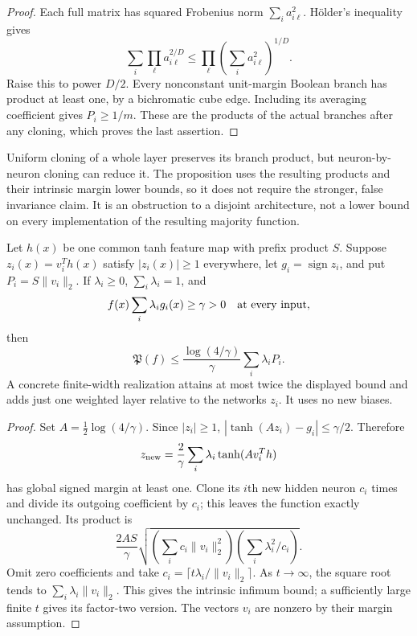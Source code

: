 \begin{proof}
Each full matrix has squared Frobenius norm $\sum_i a_{i\ell}^2$.
H\"older's inequality gives
\[
 \sum_i\prod_\ell a_{i\ell}^{2/D}
 \le\prod_\ell\left(\sum_i a_{i\ell}^2\right)^{1/D}.
\]
Raise this to power $D/2$. Every nonconstant unit-margin Boolean
branch has product at least one, by a bichromatic cube edge.
Including its averaging coefficient gives $P_i\ge1/m$.
These are the products of the actual branches after any cloning,
which proves the last assertion.
\end{proof}

Uniform cloning of a whole layer preserves its branch product, but
neuron-by-neuron cloning can reduce it. The proposition uses the
resulting products and their intrinsic margin lower bounds, so it does
not require the stronger, false invariance claim. It is an obstruction
to a disjoint architecture, not a lower bound on every implementation
of the resulting majority function.

\begin{theorem}
\label{thm:pf-shared-feature-voting}
Let $h(x)$ be one common tanh feature map with prefix product $S$.
Suppose $z_i(x)=v_i^Th(x)$ satisfy $|z_i(x)|\ge1$ everywhere,
let $g_i=\operatorname{sign}z_i$, and put $P_i=S\|v_i\|_2$.
If $\lambda_i\ge0$, $\sum_i\lambda_i=1$, and
\[
 f(x)\sum_i\lambda_i g_i(x)\ge\gamma>0
 \quad\hbox{at every input},
\]
then
\[
 \mathfrak P(f)\le
 \frac{\log(4/\gamma)}{\gamma}\sum_i\lambda_iP_i.
\]
A concrete finite-width realization attains at most twice the displayed
bound and adds just one weighted layer relative to the networks $z_i$.
It uses no new biases.
\end{theorem}

\begin{proof}
Set $A=\tfrac12\log(4/\gamma)$. Since $|z_i|\ge1$,
$|\tanh(Az_i)-g_i|\le\gamma/2$. Therefore
\[
 z_{\rm new}=\frac2\gamma\sum_i\lambda_i\tanh(Av_i^Th)
\]
has global signed margin at least one. Clone its $i$th new hidden
neuron $c_i$ times and divide its outgoing coefficient by $c_i$;
this leaves the function exactly unchanged. Its product is
\[
 \frac{2AS}{\gamma}
 \sqrt{\left(\sum_i c_i\|v_i\|_2^2\right)
       \left(\sum_i\lambda_i^2/c_i\right)}.
\]
Omit zero coefficients and take
$c_i=\lceil t\lambda_i/\|v_i\|_2\rceil$.
As $t\to\infty$, the square root tends to
$\sum_i\lambda_i\|v_i\|_2$. This gives the intrinsic infimum bound;
a sufficiently large finite $t$ gives its factor-two version.
The vectors $v_i$ are nonzero by their margin assumption.
\end{proof}


